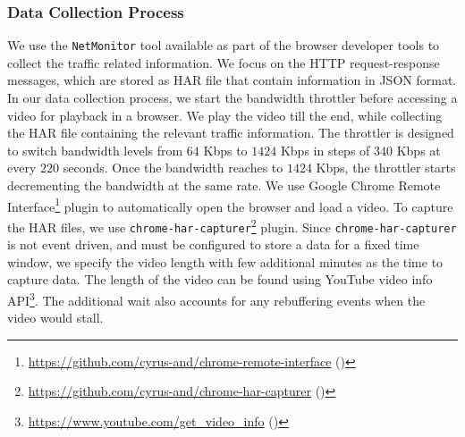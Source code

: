 \subsubsection{Data Collection Process}
We use the {\tt NetMonitor} tool available as part of the browser developer tools to collect the traffic related information.
We focus on the \ac{HTTP} request-response messages, which are stored as \ac{HAR} file that contain information in \ac{JSON} format. In our data collection process, we start the bandwidth throttler before accessing a video for playback in a browser. We play the video till the end, while collecting the \ac{HAR} file containing the relevant traffic information.
The throttler is designed to switch bandwidth levels from $64$ Kbps to $1424$ Kbps in steps of $340$ Kbps at every $220$ seconds. Once the bandwidth reaches to $1424$ Kbps, the throttler starts decrementing the bandwidth at the same rate. 
We use Google Chrome Remote Interface\footnote{\url{https://github.com/cyrus-and/chrome-remote-interface} (\lastaccessedtoday)} plugin to automatically open the browser and load a video.
To capture the \ac{HAR} files, we use \texttt{chrome-har-capturer}\footnote{\url{https://github.com/cyrus-and/chrome-har-capturer} (\lastaccessedtoday)} plugin.
Since \texttt{chrome-har-capturer} is not event driven, and must be configured to store a data for a fixed time window, we specify the video length with few additional minutes as the time to capture data. The length of the video can be found using YouTube video info \ac{API}\footnote{\url{https://www.youtube.com/get_video_info} (\lastaccessedtoday)}.
The additional wait also accounts for any rebuffering events when the video would stall.

